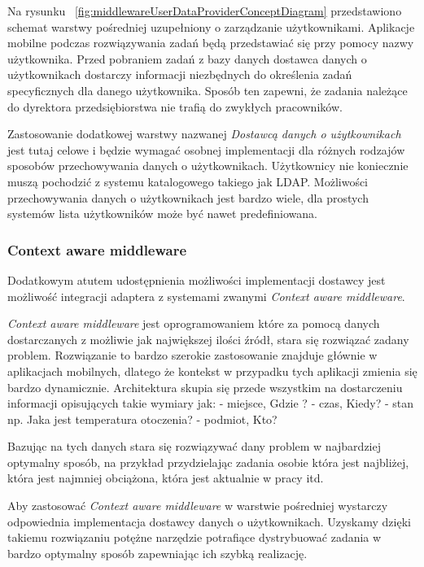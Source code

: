 Na rysunku ~\ref{fig:middlewareUserDataProviderConceptDiagram} przedstawiono schemat warstwy pośredniej uzupełniony o zarządzanie użytkownikami. Aplikacje mobilne podczas rozwiązywania zadań będą przedstawiać się przy pomocy nazwy użytkownika. Przed pobraniem zadań z bazy danych dostawca danych o użytkownikach dostarczy informacji niezbędnych do określenia zadań specyficznych dla danego użytkownika. Sposób ten zapewni, że zadania należące do dyrektora przedsiębiorstwa nie trafią do zwykłych pracowników. 

Zastosowanie dodatkowej warstwy nazwanej \textit{Dostawcą danych o użytkownikach} jest tutaj celowe i będzie wymagać osobnej implementacji dla różnych rodzajów sposobów przechowywania danych o użytkownikach. Użytkownicy nie koniecznie muszą pochodzić z systemu katalogowego takiego jak LDAP. Możliwości przechowywania danych o użytkownikach jest bardzo wiele, dla prostych systemów lista użytkowników może być nawet predefiniowana.

\subsubsection{Context aware middleware}
Dodatkowym atutem udostępnienia możliwości implementacji dostawcy jest możliwość integracji adaptera z systemami zwanymi \textit{Context aware middleware}. 

\textit{Context aware middleware} jest oprogramowaniem które za pomocą danych dostarczanych z możliwie jak największej ilości źródł, stara się rozwiązać zadany problem. Rozwiązanie to bardzo szerokie zastosowanie znajduje głównie w aplikacjach mobilnych, dlatego że kontekst w przypadku tych aplikacji zmienia się bardzo dynamicznie. Architektura skupia się przede wszystkim na dostarczeniu informacji opisujących takie wymiary jak: - miejsce, Gdzie ? - czas, Kiedy? - stan np. Jaka jest temperatura otoczenia? - podmiot, Kto?~\cite{context-aware-middleware}

Bazując na tych danych stara się rozwiązywać dany problem w najbardziej optymalny sposób, na przykład przydzielając zadania osobie która jest najbliżej, która jest najmniej obciążona, która jest aktualnie w pracy itd.

Aby zastosować \textit{Context aware middleware} w warstwie pośredniej wystarczy odpowiednia implementacja dostawcy danych o użytkownikach. Uzyskamy dzięki takiemu rozwiązaniu potężne narzędzie potrafiące dystrybuować zadania w bardzo optymalny sposób zapewniając ich szybką realizację.  

